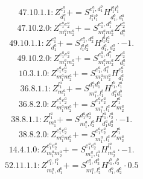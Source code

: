\documentclass[letterpaper,10pt,fleqn,leqno,onecolumn]{article}
\begin{document}
\begin{equation} \;\;\;\;\;\;  47.10.1.1: Z^{e_{1}^{a}}_{d_{1}^{a}}+=S^{e_{1}^{a},d_{1}^{b}}_{l_{1}^{a}l_{1}^{b}}H^{l_{1}^{a}l_{1}^{b}}_{d_{1}^{b},d_{1}^{a}} \end{equation}
\begin{equation} \;\;\;\;\;\;  47.10.2.0: Z^{e_{1}^{a}e_{2}^{a}}_{m_{1}^{a}m_{2}^{a}}+=S^{e_{1}^{a},d_{1}^{a}}_{m_{1}^{a}m_{2}^{a}}Z^{e_{2}^{a}}_{d_{1}^{a}} \end{equation}
\begin{equation} \;\;\;\;\;\;  49.10.1.1: Z^{e_{1}^{a}}_{d_{1}^{a}}+=S^{e_{1}^{a},d_{2}^{a}}_{l_{1}^{a}l_{2}^{a}}H^{l_{1}^{a}l_{2}^{a}}_{d_{1}^{a},d_{2}^{a}}\cdot -1. \end{equation}
\begin{equation} \;\;\;\;\;\;  49.10.2.0: Z^{e_{1}^{a}e_{2}^{a}}_{m_{1}^{a}m_{2}^{a}}+=S^{e_{1}^{a},d_{1}^{a}}_{m_{1}^{a}m_{2}^{a}}Z^{e_{2}^{a}}_{d_{1}^{a}} \end{equation}
\begin{equation} \;\;\;\;\;\;  10.3.1.0: Z^{e_{1}^{a}e_{2}^{a}}_{m_{1}^{a}m_{2}^{a}}+=S^{e_{1}^{a},d_{1}^{a}}_{m_{1}^{a}m_{2}^{a}}H^{e_{2}^{a}}_{d_{1}^{a}} \end{equation}
\begin{equation} \;\;\;\;\;\;  36.8.1.1: Z^{l_{1}^{a}}_{m_{1}^{a}}+=S^{d_{1}^{a}d_{1}^{b}}_{m_{1}^{a},l_{1}^{b}}H^{l_{1}^{b},l_{1}^{a}}_{d_{1}^{a}d_{1}^{b}} \end{equation}
\begin{equation} \;\;\;\;\;\;  36.8.2.0: Z^{e_{1}^{a}e_{2}^{a}}_{m_{1}^{a}m_{2}^{a}}+=S^{e_{1}^{a}e_{2}^{a}}_{m_{1}^{a},l_{1}^{a}}Z^{l_{1}^{a}}_{m_{2}^{a}} \end{equation}
\begin{equation} \;\;\;\;\;\;  38.8.1.1: Z^{l_{1}^{a}}_{m_{1}^{a}}+=S^{d_{1}^{a}d_{2}^{a}}_{m_{1}^{a},l_{2}^{a}}H^{l_{1}^{a},l_{2}^{a}}_{d_{1}^{a}d_{2}^{a}}\cdot -1. \end{equation}
\begin{equation} \;\;\;\;\;\;  38.8.2.0: Z^{e_{1}^{a}e_{2}^{a}}_{m_{1}^{a}m_{2}^{a}}+=S^{e_{1}^{a}e_{2}^{a}}_{m_{1}^{a},l_{1}^{a}}Z^{l_{1}^{a}}_{m_{2}^{a}} \end{equation}
\begin{equation} \;\;\;\;\;\;  14.4.1.0: Z^{e_{1}^{a}e_{2}^{a}}_{m_{1}^{a}m_{2}^{a}}+=S^{e_{1}^{a}e_{2}^{a}}_{m_{1}^{a},l_{1}^{a}}H^{l_{1}^{a}}_{m_{2}^{a}}\cdot -1. \end{equation}
\begin{equation} \;\;\;\;\;\;  52.11.1.1: Z^{e_{1}^{a},l_{1}^{b}}_{m_{1}^{a},d_{1}^{b}}+=S^{e_{1}^{a},d_{2}^{b}}_{m_{1}^{a},l_{2}^{b}}H^{l_{1}^{b},l_{2}^{b}}_{d_{1}^{b},d_{2}^{b}}\cdot 0.5 \end{equation}
\end{document}

